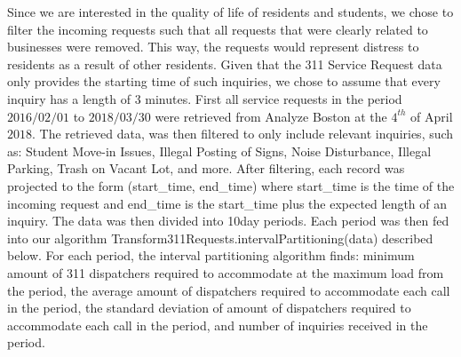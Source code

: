 \documentclass[journal, a4paper]{IEEEtran}
\begin{document}
\tab Since we are interested in the quality of life of residents and students, we chose to
filter the incoming requests such that all requests that were clearly related to
businesses were removed. This way, the requests would represent distress to
residents as a result of other residents. Given that the 311 Service Request data only
provides the starting time of such inquiries, we chose to assume that every inquiry
has a length of 3 minutes.
\tab  First all service requests in the period $2016/02/01$ to $2018/03/30$ were retrieved
from Analyze Boston at the $4^{th}$ of April $2018$. The retrieved data, was then filtered to
only include relevant inquiries, such as: Student Move-in Issues, Illegal Posting of
Signs, Noise Disturbance, Illegal Parking, Trash on Vacant Lot, and more. After
filtering, each record was projected to the form (start\_time, end\_time) where
start\_time is the time of the incoming request and end\_time is the start\_time plus the
expected length of an inquiry. The data was then divided into 10\-day periods. Each
period was then fed into our algorithm
\“Transform311Requests.intervalPartitioning(data)\” described below. For each
period, the interval partitioning algorithm finds: minimum amount of 311
dispatchers required to accommodate at the maximum load from the period, the
average amount of dispatchers required to accommodate each call in the period, the
standard deviation of amount of dispatchers required to accommodate each call in
the period, and number of inquiries received in the period.
\end{document}
